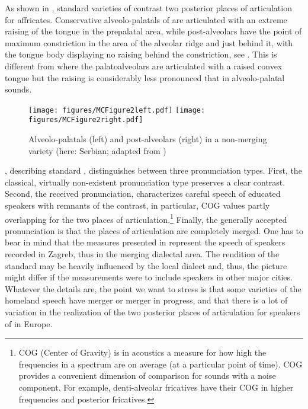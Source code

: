 \documentclass[output=paper,modfonts,newtxmath,hidelinks,]{langscibook}
\begin{document}
As shown in , standard varieties of  contrast two posterior places of articulation for affricates. Conservative alveolo-palatals of  are articulated with an extreme raising of the tongue in the prepalatal area, while post-alveolars have the point of maximum constriction in the area of the alveolar ridge and just behind it, with the tongue body displaying no raising behind the constriction, see . This is different from  where the palatoalveolars are articulated with a raised convex tongue but the raising is considerably less pronounced that in  alveolo-palatal sounds.

\begin{figure}
\texttt{[image: figures/MCFigure2left.pdf]}
\texttt{[image: figures/MCFigure2right.pdf]}
\caption{\label{fig:mihajlovic:2} Alveolo-palatals (left) and post-alveolars (right) in a non-merging variety (here: Serbian; adapted from \citealt{Miletic1958})}
\end{figure}


\citet{Skaric2009}, %
describing standard , distinguishes between three pronunciation types. First, the classical, virtually non-existent pronunciation type preserves a clear contrast. Second, the received pronunciation, characterizes careful speech of educated speakers with remnants of the contrast, in particular, COG values partly overlapping for the two places of articulation.\footnote{COG (Center of Gravity) is in acoustics a measure for how high the frequencies in a spectrum are on average (at a particular point of time). COG provides a convenient dimension of comparison for sounds with a noise component. For example, denti-alveolar fricatives have their COG in higher frequencies and posterior fricatives.} Finally, the generally accepted pronunciation is that the places of articulation are completely merged. One has to bear in mind that the measures presented in \citet{Skaric2009} represent the speech of speakers recorded in Zagreb, thus in the merging dialectal area. The rendition of the standard may be heavily influenced by the local dialect and, thus, the picture might differ if the measurements were to include speakers in other  major cities. Whatever the details are, the point we want to stress is that some varieties of the homeland speech have merger or merger in progress, and that there is a lot of variation in the realization of the two posterior places of articulation for speakers of  in Europe.
\end{document}
